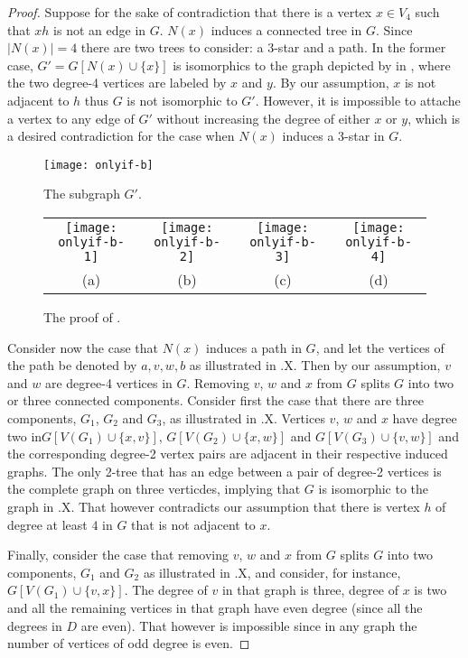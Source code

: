 \documentclass[lotsofwhite,charterfonts]{patmorin}
\begin{document}
\begin{proof}
Suppose for the sake of contradiction that there is a vertex $x\in
V_4$ such that $xh$ is not an edge in $G$. $N(x)$ induces a connected
tree in $G$. Since $|N(x)|=4$ there are two trees to consider: a
3-star and a path. In the former case, $G'=G[N(x)\cup \{x\}]$ is
isomorphics to the graph depicted by in , where the two
degree-4 vertices are labeled by $x$ and $y$. By our assumption, $x$
is not adjacent to $h$ thus $G$ is not isomorphic to $G'$. However, it
is impossible to attache a vertex to any edge of $G'$ without
increasing the degree of either $x$ or $y$, which is a desired
contradiction for the case when $N(x)$ induces a 3-star in $G$.
\begin{figure}
\begin{center}\texttt{[image: onlyif-b]}\end{center}
\caption{The subgraph $G'$.}
\end{figure}
\begin{figure}
\begin{center}\begin{tabular}{cccc}
\texttt{[image: onlyif-b-1]} &
\texttt{[image: onlyif-b-2]} &
\texttt{[image: onlyif-b-3]} &
\texttt{[image: onlyif-b-4]} \\
(a) & (b) & (c) & (d)
\end{tabular}\end{center}
\caption{The proof of .}
\end{figure}
Consider now the case that $N(x)$ induces a path in $G$, and let the
vertices of the path be denoted by $a,v,w,b$ as illustrated in
.X. Then by our assumption, $v$ and $w$ are degree-4
vertices in $G$. Removing $v$, $w$ and $x$ from $G$ splits $G$ into
two or three connected components. Consider first the case that there
are three components, $G_1$, $G_2$ and $G_3$, as illustrated in
.X. Vertices $v$, $w$ and $x$ have degree two
in$G[V(G_1)\cup \{x,v\}]$, $G[V(G_2)\cup \{x,w\}]$  and $G[V(G_3)\cup
\{v,w\}]$ and the corresponding degree-2 vertex pairs are adjacent in
their respective induced graphs. The only 2-tree that has an edge
between a pair of degree-2 vertices is the complete graph on three
verticdes, implying that $G$ is isomorphic to the graph in
.X. That however contradicts our assumption that there is
vertex $h$ of degree at least $4$ in $G$ that is not adjacent to $x$.

Finally, consider the case that removing $v$, $w$ and $x$ from $G$
splits $G$ into two components, $G_1$ and $G_2$ as illustrated in
.X, and consider, for instance, $G[V(G_1)\cup \{v,x\}]$. The
degree of $v$ in that graph is three, degree of $x$ is two and all the
remaining vertices in that graph have even degree (since all the
degrees in $D$ are even). That however is impossible since in any
graph the number of vertices of odd degree is even.


\end{proof}
\end{document}
